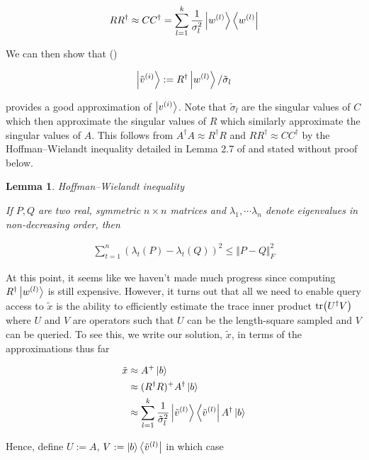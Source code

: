 \documentclass[11pt]{article}
\newcommand\0{\mathbf{0}}
\newcommand\<{\langle}
\renewcommand\>{\rangle}
\newtheorem{lemma}[theorem]{Lemma}
\begin{document}
\begin{align*}
RR^\dag \approx CC^\dag = \sum_{l=1}^k \frac{1}{\sigma_l^2}\ket{w^{(l)}}\bra{w^{(l)}}
\end{align*}


We can then show that ()

\begin{align}
\label{def:approx-right}
\ket{\tilde{v}^{(i)}} := R^\dag \ket{w^{(l)}} / \tilde{\sigma}_l
\end{align}

provides a good approximation of $\ket{v^{(i)}}$. Note that $\tilde{\sigma}_l$ are the singular values of $C$ which then approximate the singular values of $R$ which similarly approximate the singular values of $A$. This follows from $A^\dag A \approx R^\dag R$ and $RR^\dag \approx CC^\dag$ by the Hoffman--Wielandt inequality detailed in Lemma 2.7 of \cite{kannan2017randomized} and stated without proof below.

\begin{lemma}Hoffman--Wielandt inequality

	If $P, Q$ are two real, symmetric $n \times n$ matrices and $\lambda_1, \cdots \lambda_n$ denote eigenvalues in non-decreasing order, then
	
	\begin{align*}
		\sum_{t=1}^n(\lambda_t(P) - \lambda_t(Q))^2 \leq \Vert P - Q \Vert_F^2
	\end{align*}
\end{lemma}


At this point, it seems like we haven't made much progress since computing $R^\dag \ket{w^{(l)}}$ is still expensive. However, it turns out that all we need to enable query access to $\tilde{x}$ is the ability to efficiently estimate the trace inner product $\tr(U^\dag V)$ where $U$ and $V$ are operators such that $U$ can be the length-square sampled and $V$ can be queried. To see this, we write our solution, $\tilde{x}$, in terms of the approximations thus far

\begin{align*}
	\tilde{x} &\approx A^+ \ket{b} \\
	&\approx (R^\dag R)^+ A^\dag \ket{b}\\
	&\approx \sum_{l = 1}^k \frac{1}{\tilde{\sigma}_l^2} \ket{\tilde{v}^{(l)}} \bra{\tilde{v}^{(l)}} A^\dag \ket{b}
\end{align*}

Hence, define $U := A$, $V := \ket{b}\bra{\tilde{v}^{(l)}}$ in which case 
\end{document}
